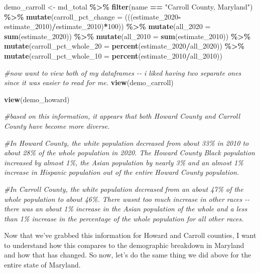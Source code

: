 \documentclass[
]{article}
\newenvironment{Shaded}{\begin{snugshade}}{\end{snugshade}}
\newcommand{\AttributeTok}[1]{\textcolor[rgb]{0.13,0.29,0.53}{#1}}
\newcommand{\CommentTok}[1]{\textcolor[rgb]{0.56,0.35,0.01}{\textit{#1}}}
\newcommand{\DecValTok}[1]{\textcolor[rgb]{0.00,0.00,0.81}{#1}}
\newcommand{\FunctionTok}[1]{\textcolor[rgb]{0.13,0.29,0.53}{\textbf{#1}}}
\newcommand{\NormalTok}[1]{#1}
\newcommand{\OtherTok}[1]{\textcolor[rgb]{0.56,0.35,0.01}{#1}}
\newcommand{\SpecialCharTok}[1]{\textcolor[rgb]{0.81,0.36,0.00}{\textbf{#1}}}
\newcommand{\StringTok}[1]{\textcolor[rgb]{0.31,0.60,0.02}{#1}}
\begin{document}
\begin{Shaded}
\begin{Highlighting}[]
\NormalTok{demo\_carroll }\OtherTok{\textless{}{-}}\NormalTok{ md\_total }\SpecialCharTok{\%\textgreater{}\%} 
  \FunctionTok{filter}\NormalTok{(name }\SpecialCharTok{==} \StringTok{"Carroll County, Maryland"}\NormalTok{) }\SpecialCharTok{\%\textgreater{}\%} 
  \FunctionTok{mutate}\NormalTok{(}\AttributeTok{carroll\_pct\_change =}\NormalTok{ (((estimate\_2020}\SpecialCharTok{{-}}\NormalTok{estimate\_2010)}\SpecialCharTok{/}\NormalTok{estimate\_2010)}\SpecialCharTok{*}\DecValTok{100}\NormalTok{)) }\SpecialCharTok{\%\textgreater{}\%} 
  \FunctionTok{mutate}\NormalTok{(}\AttributeTok{all\_2020 =} \FunctionTok{sum}\NormalTok{(estimate\_2020)) }\SpecialCharTok{\%\textgreater{}\%} 
  \FunctionTok{mutate}\NormalTok{(}\AttributeTok{all\_2010 =} \FunctionTok{sum}\NormalTok{(estimate\_2010)) }\SpecialCharTok{\%\textgreater{}\%} 
  \FunctionTok{mutate}\NormalTok{(}\AttributeTok{carroll\_pct\_whole\_20 =} \FunctionTok{percent}\NormalTok{(estimate\_2020}\SpecialCharTok{/}\NormalTok{all\_2020)) }\SpecialCharTok{\%\textgreater{}\%} 
  \FunctionTok{mutate}\NormalTok{(}\AttributeTok{carroll\_pct\_whole\_10 =} \FunctionTok{percent}\NormalTok{(estimate\_2010}\SpecialCharTok{/}\NormalTok{all\_2010))}

\CommentTok{\#now want to view both of my dataframes {-}{-} i liked having two separate ones since it was easier to read for me.}
\FunctionTok{view}\NormalTok{(demo\_carroll)}

\FunctionTok{view}\NormalTok{(demo\_howard)}

\CommentTok{\#based on this information, it appears that both Howard County and Carroll County have become more diverse. }

\CommentTok{\#In Howard County, the white population decreased from about 33\% in 2010 to about 28\% of the whole population in 2020. The Howard County Black population increased by almost 1\%, the Asian population by nearly 3\% and an almost 1\% increase in Hispanic population out of the entire Howard County population. }

\CommentTok{\#In Carroll County, the white population decreased from an about 47\% of the whole population to about 46\%. There wasn\textquotesingle{}t too much increase in other races {-}{-} there was an about 1\% increase in the Asian population of the whole and a less than 1\% increase in the percentage of the whole population for all other races. }
\end{Highlighting}
\end{Shaded}

Now that we've grabbed this information for Howard and Carroll counties,
I want to understand how this compares to the demographic breakdown in
Maryland and how that has changed. So now, let's do the same thing we
did above for the entire state of Maryland.
\end{document}
